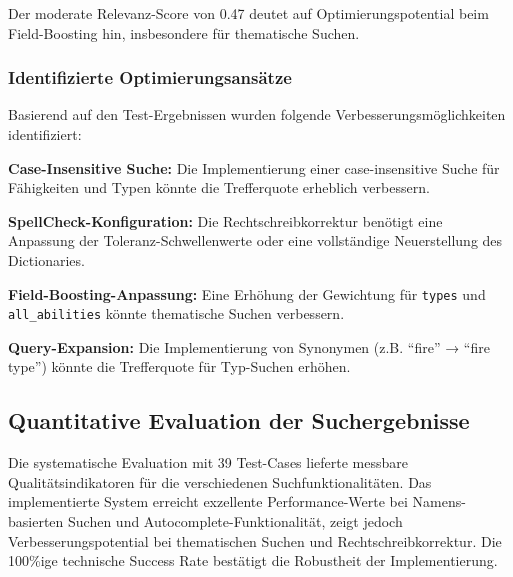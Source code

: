 Der moderate Relevanz-Score von 0.47 deutet auf Optimierungspotential beim Field-Boosting hin, insbesondere für thematische Suchen.

\subsubsection{Identifizierte Optimierungsansätze}

Basierend auf den Test-Ergebnissen wurden folgende Verbesserungsmöglichkeiten identifiziert:

\textbf{Case-Insensitive Suche:} Die Implementierung einer case-insensitive Suche für Fähigkeiten und Typen könnte die Trefferquote erheblich verbessern.

\textbf{SpellCheck-Konfiguration:} Die Rechtschreibkorrektur benötigt eine Anpassung der Toleranz-Schwellenwerte oder eine vollständige Neuerstellung des Dictionaries.

\textbf{Field-Boosting-Anpassung:} Eine Erhöhung der Gewichtung für \texttt{types} und \texttt{all\_abilities} könnte thematische Suchen verbessern.

\textbf{Query-Expansion:} Die Implementierung von Synonymen (z.B. "`fire"' → "`fire type"') könnte die Trefferquote für Typ-Suchen erhöhen.

\subsection{Quantitative Evaluation der Suchergebnisse}

Die systematische Evaluation mit 39 Test-Cases lieferte messbare Qualitätsindikatoren für die verschiedenen Suchfunktionalitäten. Das implementierte System erreicht exzellente Performance-Werte bei Namens-basierten Suchen und Autocomplete-Funktionalität, zeigt jedoch Verbesserungspotential bei thematischen Suchen und Rechtschreibkorrektur. Die 100\%ige technische Success Rate bestätigt die Robustheit der Implementierung.